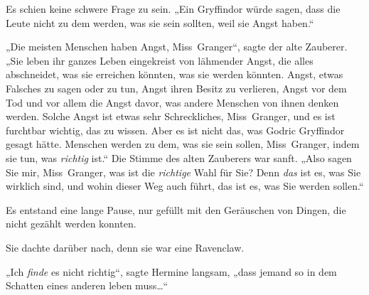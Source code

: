 Es schien keine schwere Frage zu sein. „Ein Gryffindor würde sagen, dass die Leute nicht zu dem werden, was sie sein sollten, weil sie Angst haben.“

„Die meisten Menschen haben Angst, Miss~Granger“, sagte der alte Zauberer. „Sie leben ihr ganzes Leben eingekreist von lähmender Angst, die alles abschneidet, was sie erreichen könnten, was sie werden könnten. Angst, etwas Falsches zu sagen oder zu tun, Angst ihren Besitz zu verlieren, Angst vor dem Tod und vor allem die Angst davor, was andere Menschen von ihnen denken werden. Solche Angst ist etwas sehr Schreckliches, Miss~Granger, und es ist furchtbar wichtig, das zu wissen. Aber es ist nicht das, was Godric Gryffindor gesagt hätte. Menschen werden zu dem, was sie sein sollen, Miss~Granger, indem sie tun, was \emph{richtig} ist.“ Die Stimme des alten Zauberers war sanft. „Also sagen Sie mir, Miss~Granger, was ist die \emph{richtige} Wahl für Sie? Denn \emph{das} ist es, was Sie wirklich sind, und wohin dieser Weg auch führt, das ist es, was Sie werden sollen.“

Es entstand eine lange Pause, nur gefüllt mit den Geräuschen von Dingen, die nicht gezählt werden konnten.

Sie dachte darüber nach, denn sie war eine Ravenclaw.

„Ich \emph{finde} es nicht richtig“, sagte Hermine langsam, „dass jemand so in dem Schatten eines anderen leben muss…“

